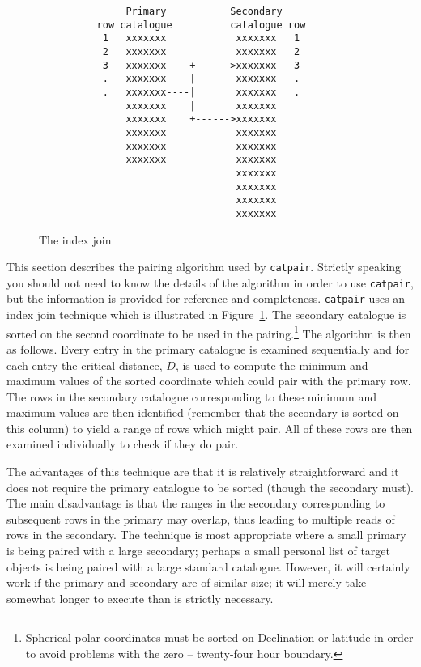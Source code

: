\documentclass[twoside,11pt]{article}
\renewcommand{\_}{\texttt{\symbol{95}}}
\begin{document}
\begin{figure}[htbp]

\begin{verbatim}
               Primary           Secondary
          row catalogue          catalogue row
           1   xxxxxxx            xxxxxxx   1
           2   xxxxxxx            xxxxxxx   2
           3   xxxxxxx    +------>xxxxxxx   3
           .   xxxxxxx    |       xxxxxxx   .
           .   xxxxxxx----|       xxxxxxx   .
               xxxxxxx    |       xxxxxxx
               xxxxxxx    +------>xxxxxxx
               xxxxxxx            xxxxxxx
               xxxxxxx            xxxxxxx
               xxxxxxx            xxxxxxx
                                  xxxxxxx
                                  xxxxxxx
                                  xxxxxxx
                                  xxxxxxx
\end{verbatim}

\caption{The index join \label{PAIR_INDEX_JOIN} }

\end{figure}

This section describes the pairing algorithm used by {\tt catpair}.
Strictly speaking you should not need to know the details of the
algorithm in order to use {\tt catpair}, but the information is
provided for reference and completeness. {\tt catpair} uses an index join
technique which is illustrated in Figure~\ref{PAIR_INDEX_JOIN}. The
secondary catalogue is sorted on the second coordinate to be used in
the pairing.\footnote{Spherical-polar coordinates must be sorted on
Declination or latitude in order to avoid problems with the zero --
twenty-four hour boundary.} The algorithm is then as follows. Every
entry in the primary catalogue is examined sequentially and for each
entry the critical distance, $D$, is used to compute the minimum and
maximum values of the sorted coordinate which could pair with the
primary row. The rows in the secondary catalogue corresponding to these
minimum and maximum values are then identified (remember that the
secondary is sorted on this column) to yield a range of rows which might
pair. All of these rows are then examined individually to check if
they do pair.

The advantages of this technique are that it is relatively straightforward
and it does not require the primary catalogue to be sorted (though the
secondary must). The main disadvantage is that the ranges in the secondary
corresponding to subsequent rows in the primary may overlap, thus leading
to multiple reads of rows in the secondary. The technique is most
appropriate where a small primary is being paired with a large secondary;
perhaps a small personal list of target objects is being paired with a
large standard catalogue. However, it will certainly work if
the primary and secondary are of similar size; it will merely take
somewhat longer to execute than is strictly necessary.
\end{document}
